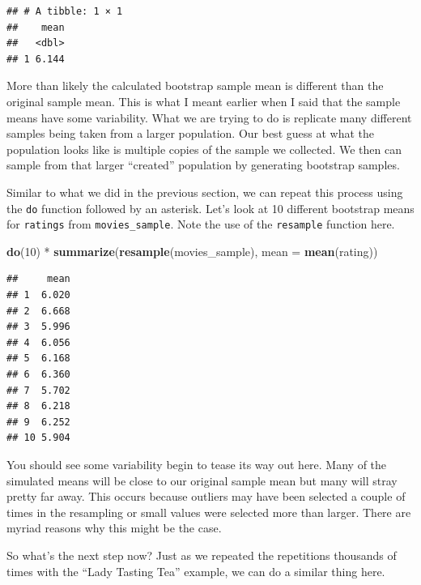 \documentclass[]{tufte-book}
\newenvironment{Shaded}{\begin{snugshade}}{\end{snugshade}}
\newcommand{\KeywordTok}[1]{\textcolor[rgb]{0.13,0.29,0.53}{\textbf{{#1}}}}
\newcommand{\DataTypeTok}[1]{\textcolor[rgb]{0.13,0.29,0.53}{{#1}}}
\newcommand{\DecValTok}[1]{\textcolor[rgb]{0.00,0.00,0.81}{{#1}}}
\newcommand{\StringTok}[1]{\textcolor[rgb]{0.31,0.60,0.02}{{#1}}}
\newcommand{\NormalTok}[1]{{#1}}
\begin{document}
\begin{verbatim}
## # A tibble: 1 × 1
##    mean
##   <dbl>
## 1 6.144
\end{verbatim}

More than likely the calculated bootstrap sample mean is different than
the original sample mean. This is what I meant earlier when I said that
the sample means have some variability. What we are trying to do is
replicate many different samples being taken from a larger population.
Our best guess at what the population looks like is multiple copies of
the sample we collected. We then can sample from that larger ``created''
population by generating bootstrap samples.

Similar to what we did in the previous section, we can repeat this
process using the \texttt{do} function followed by an asterisk. Let's
look at 10 different bootstrap means for \texttt{ratings} from
\texttt{movies\_sample}. Note the use of the \texttt{resample} function
here.

\begin{Shaded}
\begin{Highlighting}[]
\KeywordTok{do}\NormalTok{(}\DecValTok{10}\NormalTok{) *}\StringTok{ }\KeywordTok{summarize}\NormalTok{(}\KeywordTok{resample}\NormalTok{(movies_sample), }\DataTypeTok{mean =} \KeywordTok{mean}\NormalTok{(rating))}
\end{Highlighting}
\end{Shaded}

\begin{verbatim}
##     mean
## 1  6.020
## 2  6.668
## 3  5.996
## 4  6.056
## 5  6.168
## 6  6.360
## 7  5.702
## 8  6.218
## 9  6.252
## 10 5.904
\end{verbatim}

You should see some variability begin to tease its way out here. Many of
the simulated means will be close to our original sample mean but many
will stray pretty far away. This occurs because outliers may have been
selected a couple of times in the resampling or small values were
selected more than larger. There are myriad reasons why this might be
the case.

So what's the next step now? Just as we repeated the repetitions
thousands of times with the ``Lady Tasting Tea'' example, we can do a
similar thing here.

\begin{Shaded}
\end{Shaded}
\end{document}
